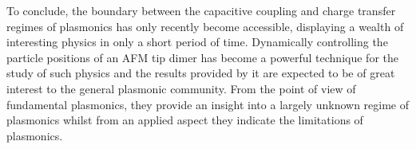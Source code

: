 \documentclass[12pt, a4paper, oneside]{book}
\begin{document}
To conclude, the boundary between the capacitive coupling and charge transfer regimes of plasmonics has only recently become accessible, displaying a wealth of interesting physics in only a short period of time. Dynamically controlling the particle positions of an AFM tip dimer has become a powerful technique for the study of such physics and the results provided by it are expected to be of great interest to the general plasmonic community. From the point of view of fundamental plasmonics, they provide an insight into a largely unknown regime of plasmonics whilst from an applied aspect they indicate the limitations of plasmonics.

\ifstandalone
\begin{singlespace}
\fontsize{8pt}{1em}\selectfont
\printbibliography[notcategory=fullcited]
\end{singlespace}
\fi
\end{document}
